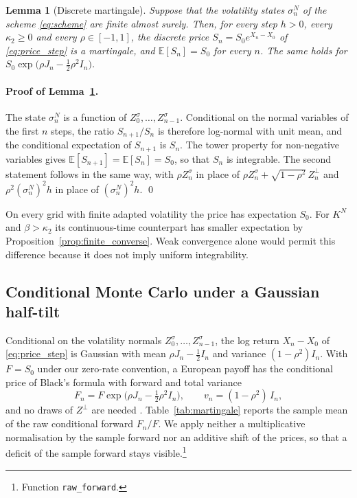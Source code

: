 \documentclass[11pt,a4paper]{article}
\newtheorem{lemma}[theorem]{Lemma}
\theoremstyle{definition}
\newcommand{\E}{\mathbb{E}}
\begin{document}
\begin{lemma}[Discrete martingale]\label{lem:discrete_martingale}
Suppose that the volatility states $\sigma^N_n$ of the scheme \eqref{eq:scheme} are finite almost surely. Then, for every step $h>0$, every $\kappa_2\ge0$ and every $\rho\in[-1,1]$, the discrete price $S_n=S_0e^{X_n-X_0}$ of \eqref{eq:price_step} is a martingale, and $\E[S_n]=S_0$ for every $n$. The same holds for $S_0\exp\big(\rho J_n-\tfrac12\rho^2I_n\big)$.
\end{lemma}

\paragraph{Proof of Lemma~\ref{lem:discrete_martingale}.} The state $\sigma^N_n$ is a function of $Z^\sigma_0,\dots,Z^\sigma_{n-1}$. Conditional on the normal variables of the first $n$ steps, the ratio $S_{n+1}/S_n$ is therefore log-normal with unit mean, and the conditional expectation of $S_{n+1}$ is $S_n$. The tower property for non-negative variables gives $\E[S_{n+1}]=\E[S_n]=S_0$, so that $S_n$ is integrable. The second statement follows in the same way, with $\rho Z^\sigma_n$ in place of $\rho Z^\sigma_n+\sqrt{1-\rho^2}\,Z^\perp_n$ and $\rho^2(\sigma^N_n)^2h$ in place of $(\sigma^N_n)^2h$. \qed

On every grid with finite adapted volatility the price has expectation $S_0$. For $K^N$ and $\beta>\kappa_2$ its continuous-time counterpart has smaller expectation by Proposition~\ref{prop:finite_converse}. Weak convergence alone would permit this difference because it does not imply uniform integrability.

\subsection{Conditional Monte Carlo under a Gaussian half-tilt}\label{sec:conditional_mc}

Conditional on the volatility normals $Z^\sigma_0,\dots,Z^\sigma_{n-1}$, the log return $X_n-X_0$ of \eqref{eq:price_step} is Gaussian with mean $\rho J_n-\tfrac12I_n$ and variance $(1-\rho^2)I_n$. With $F=S_0$ under our zero-rate convention, a European payoff has the conditional price of Black's formula with forward and total variance
\begin{equation}\label{eq:conditional_forward}
F_n=F\exp\big(\rho J_n-\tfrac12\rho^2I_n\big),\qquad v_n=(1-\rho^2)\,I_n,
\end{equation}
and no draws of $Z^\perp$ are needed \citep{Willard1997,RomanoTouzi1997}. Table~\ref{tab:martingale} reports the sample mean of the raw conditional forward $F_n/F$. We apply neither a multiplicative normalisation by the sample forward nor an additive shift of the prices, so that a deficit of the sample forward stays visible.\footnote{Function \texttt{raw\_forward}.}
\end{document}
